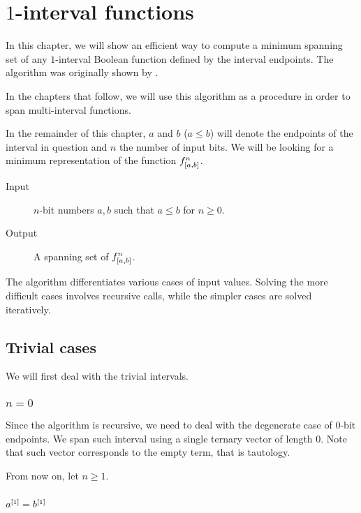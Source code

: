 \chapter{\texorpdfstring{$1$}{1}-interval functions}
\label{chap:1interval}

In this chapter,
we will show an efficient way to compute
a minimum spanning set of any $1$-interval Boolean function
defined by the interval endpoints.
The algorithm was originally shown by
\citet{Schieber2005154}.

In the chapters that follow,
we will use this algorithm as a procedure
in order to span multi-interval functions.

In the remainder of this chapter,
$a$ and $b$ ($a \leq b$) will denote the endpoints
of the interval in question
and $n$ the number of input bits.
We will be looking for a minimum representation
of the function $f^{n}_{[a, b]}$.

\begin{description}
\item[Input] $n$-bit numbers $a, b$ such that $a \leq b$ for $n \geq 0$.
\item[Output] A spanning set of $f^{n}_{[a, b]}$.
\end{description}

The algorithm differentiates various cases
of input values.
Solving the more difficult cases involves recursive calls,
while the simpler cases are solved iteratively.

\section{Trivial cases}

We will first deal with the trivial intervals.

\subsection{\texorpdfstring{$n=0$}{n=0}}

Since the algorithm is recursive,
we need to deal with the degenerate case
of $0$-bit endpoints.
We span such interval using a single ternary vector
of length $0$.
Note that such vector corresponds to the empty term,
that is tautology.

From now on, let $n \geq 1$.

\subsection{\texorpdfstring{$a^{[1]} = b^{[1]}$}{ = }}
\label{sec:commonprefix}

